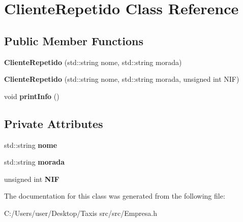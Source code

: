 \hypertarget{class_cliente_repetido}{}\section{Cliente\+Repetido Class Reference}
\label{class_cliente_repetido}
\subsection*{Public Member Functions}
\begin{DoxyCompactItemize}
\item 
\mbox{\label{class_cliente_repetido_a9cea00e5f8ccbdc17b1255c18b0db76a}} 
{\bfseries Cliente\+Repetido} (std\+::string nome, std\+::string morada)
\item 
\mbox{\label{class_cliente_repetido_aef162764c8915bc8b828819810dfb244}} 
{\bfseries Cliente\+Repetido} (std\+::string nome, std\+::string morada, unsigned int N\+IF)
\item 
\mbox{\label{class_cliente_repetido_aaf0c377313c9c28280c9f31c2e390f9c}} 
void {\bfseries print\+Info} ()
\end{DoxyCompactItemize}
\subsection*{Private Attributes}
\begin{DoxyCompactItemize}
\item 
\mbox{\label{class_cliente_repetido_a2456d62012c9fb5059eb3e55563ba73d}} 
std\+::string {\bfseries nome}
\item 
\mbox{\label{class_cliente_repetido_af103299aa577b7be308b4acfa394805f}} 
std\+::string {\bfseries morada}
\item 
\mbox{\label{class_cliente_repetido_a3741557d88f69acdec3ef7c7a1f47fe6}} 
unsigned int {\bfseries N\+IF}
\end{DoxyCompactItemize}


The documentation for this class was generated from the following file\+:\begin{DoxyCompactItemize}
\item 
C\+:/\+Users/user/\+Desktop/\+Taxis src/src/Empresa.\+h\end{DoxyCompactItemize}
